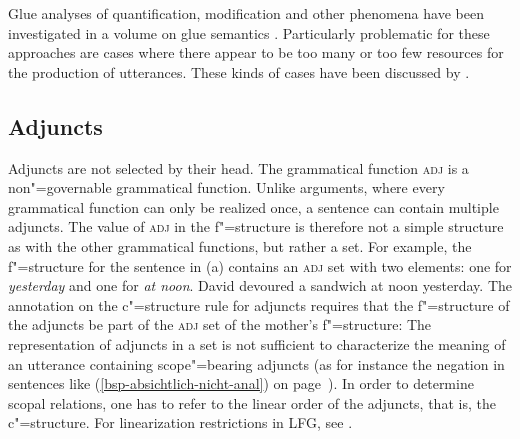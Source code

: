 Glue analyses of quantification, modification and other phenomena have been investigated in a volume on glue semantics \citep{Dalrymple99a-ed}. Particularly
problematic for these approaches are cases where there appear to be too many or too few resources for the production of utterances. These kinds of cases have been discussed
by \citet{Asudeh04a-u}.

\subsection{Adjuncts}
\label{Abschnitt-LFG-Adjunkte}

Adjuncts are not selected by their head. The grammatical function \textsc{adj} is a non"=governable grammatical function. Unlike arguments, where every grammatical
function can only be realized once, a sentence can contain multiple adjuncts. The value of \textsc{adj} in the f"=structure is therefore not a simple structure as with the other
grammatical functions, but rather a set. For example, the f"=structure for the sentence in (a)
contains an \textsc{adj} set with two elements: one for \emph{yesterday} and one for \emph{at noon}.
\eal
\ex\label{ex-david-devoured-a-sandwich-at-noon-yesterday} David devoured a sandwich at noon yesterday.
\ex\label{fstruc-david-devoured-a-sandwich-at-noon-yesterday} 
\zl
%
The annotation on the c"=structure rule for adjuncts requires that the f"=structure of the adjuncts
be part of the \textsc{adj} set of the mother's f"=structure:
\ea
\label{ex-LFG-adjuncts-rule}
\z
The representation of adjuncts in a set is not sufficient to characterize the meaning of an
utterance containing scope"=bearing adjuncts (as for instance the negation in sentences like (\ref{bsp-absichtlich-nicht-anal})
on page~\pageref{bsp-absichtlich-nicht-anal}). In order to determine scopal relations, one has to
refer to the linear order of the adjuncts, that is, the c"=structure. For linearization
restrictions in LFG, see . 

